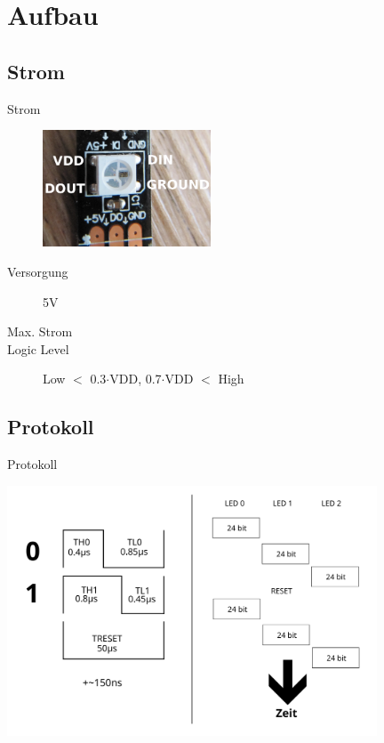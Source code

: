 \documentclass{beamer}
\begin{document}
\section{Aufbau}
\subsection{Strom}
\begin{frame}{Strom}
\begin{figure}[h]
 \centering
 \includegraphics[width=5cm,keepaspectratio=true]{./WS2812B_CloseUp.png}
\end{figure}

\begin{description}
\item[Versorgung] 5V
\item[Max. Strom]
\item[Logic Level] Low  $<$ 0.3$\cdot$VDD, 0.7$\cdot$VDD $<$ High
\end{description}

\end{frame}

\subsection{Protokoll}
\begin{frame}{Protokoll}
\begin{center}
 \includegraphics[width=11cm]{protokoll}
\end{center}
\end{frame}
\end{document}
